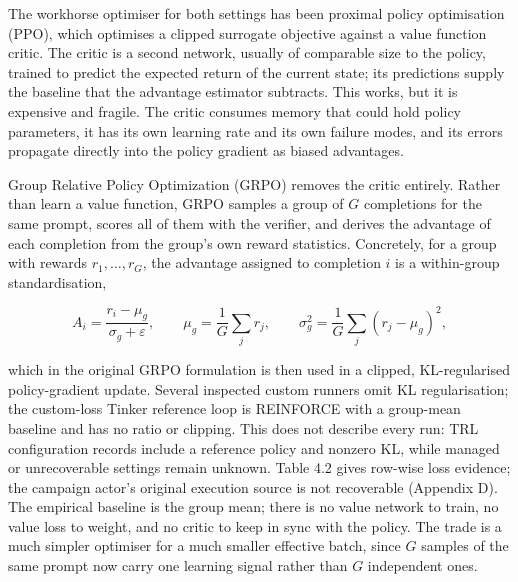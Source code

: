 \documentclass[12pt,a4paper]{report}
\begin{document}
The workhorse optimiser for both settings has been proximal policy
optimisation (PPO), which optimises a clipped surrogate objective
against a value function critic. The critic is a second network, usually
of comparable size to the policy, trained to predict the expected return
of the current state; its predictions supply the baseline that the
advantage estimator subtracts. This works, but it is expensive and
fragile. The critic consumes memory that could hold policy parameters,
it has its own learning rate and its own failure modes, and its errors
propagate directly into the policy gradient as biased advantages.

Group Relative Policy Optimization (GRPO) removes the critic entirely.
Rather than learn a value function, GRPO samples a group of \(G\)
completions for the same prompt, scores all of them with the verifier,
and derives the advantage of each completion from the group's own reward
statistics. Concretely, for a group with rewards \(r_1, \dots, r_G\),
the advantage assigned to completion \(i\) is a within-group
standardisation,

\[A_i = \frac{r_i - \mu_g}{\sigma_g + \varepsilon}, \qquad \mu_g = \frac{1}{G}\sum_j r_j, \qquad \sigma_g^2 = \frac{1}{G}\sum_j (r_j - \mu_g)^2,\]

which in the original GRPO formulation is then used in a clipped,
KL-regularised policy-gradient update. Several inspected custom runners
omit KL regularisation; the custom-loss Tinker reference loop is
REINFORCE with a group-mean baseline and has no ratio or clipping. This
does not describe every run: TRL configuration records include a
reference policy and nonzero KL, while managed or unrecoverable settings
remain unknown. Table 4.2 gives row-wise loss evidence; the campaign
actor's original execution source is not recoverable (Appendix D). The
empirical baseline is the group mean; there is no value network to
train, no value loss to weight, and no critic to keep in sync with the
policy. The trade is a much simpler optimiser for a much smaller
effective batch, since \(G\) samples of the same prompt now carry one
learning signal rather than \(G\) independent ones.
\end{document}
